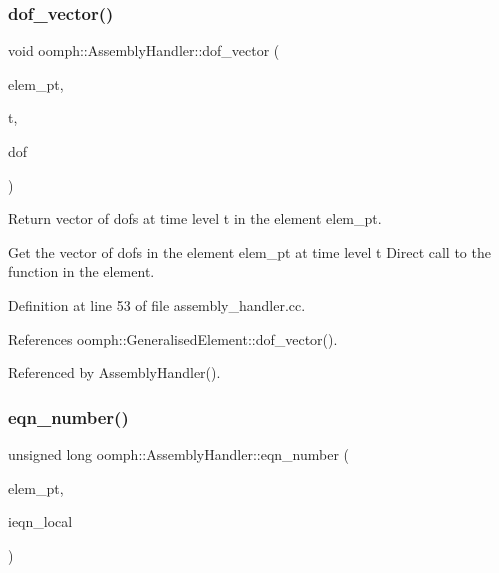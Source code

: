 \subsubsection{\texorpdfstring{dof\+\_\+vector()}{dof\_vector()}}
{\footnotesize\ttfamily void oomph\+::\+Assembly\+Handler\+::dof\+\_\+vector (\begin{DoxyParamCaption}\item[{\hyperlink{classoomph_1_1GeneralisedElement}{Generalised\+Element} $\ast$const \&}]{elem\+\_\+pt,  }\item[{const unsigned \&}]{t,  }\item[{\hyperlink{classoomph_1_1Vector}{Vector}$<$ double $>$ \&}]{dof }\end{DoxyParamCaption})\hspace{0.3cm}{\ttfamily [virtual]}}



Return vector of dofs at time level t in the element elem\+\_\+pt. 

Get the vector of dofs in the element elem\+\_\+pt at time level t Direct call to the function in the element. 

Definition at line 53 of file assembly\+\_\+handler.\+cc.



References oomph\+::\+Generalised\+Element\+::dof\+\_\+vector().



Referenced by Assembly\+Handler().

\mbox{\label{classoomph_1_1AssemblyHandler_a94d28e2de2559cde803d1ba2195b5290}} 
\subsubsection{\texorpdfstring{eqn\+\_\+number()}{eqn\_number()}}
{\footnotesize\ttfamily unsigned long oomph\+::\+Assembly\+Handler\+::eqn\+\_\+number (\begin{DoxyParamCaption}\item[{\hyperlink{classoomph_1_1GeneralisedElement}{Generalised\+Element} $\ast$const \&}]{elem\+\_\+pt,  }\item[{const unsigned \&}]{ieqn\+\_\+local }\end{DoxyParamCaption})\hspace{0.3cm}{\ttfamily [virtual]}}



